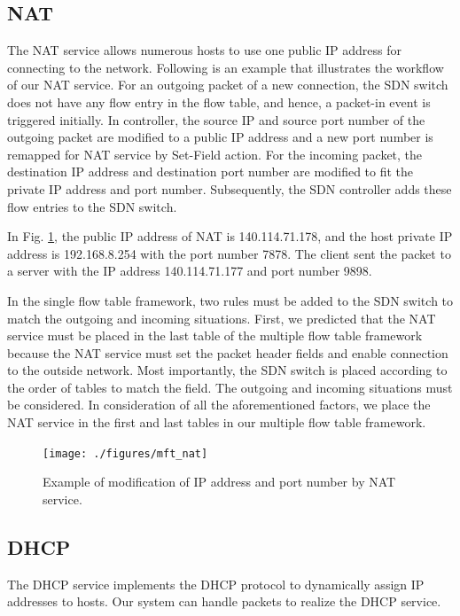\documentclass[conference]{IEEEtran}
\begin{document}
\subsection{NAT}
The NAT service allows numerous hosts to use one public IP address for connecting to the network.
Following is an example that illustrates the workflow of our NAT service.
For an outgoing packet of a new connection, the SDN switch does not have any flow entry in the flow table, and hence, a packet-in event is triggered initially.
In controller, the source IP and source port number of the outgoing packet are modified to a public IP address and a new port number is remapped for NAT service by Set-Field action.
For the incoming packet, the destination IP address and destination port number are modified to fit the private IP address and port number.
Subsequently, the SDN controller adds these flow entries to the SDN switch.

In Fig. \ref{fig:mft_nat}, the public IP address of NAT is 140.114.71.178, and the host private IP address is 192.168.8.254 with the port number 7878. The client sent the packet to a server with the IP address 140.114.71.177 and port number 9898.

In the single flow table framework, two rules must be added to the SDN switch to match the outgoing and incoming situations.
First, we predicted that the NAT service must be placed in the last table of the multiple flow table framework because the NAT service must set the packet header fields and enable connection to the outside network.
Most importantly, the SDN switch is placed according to the order of tables to match the field.
The outgoing and incoming situations must be considered.
In consideration of all the aforementioned factors, we place the NAT service in the first and last tables in our multiple flow table framework.

\begin{figure}[!t]
\centering
\texttt{[image: ./figures/mft\_nat]}
\caption{Example of modification of IP address and port number by NAT service.}
\label{fig:mft_nat}
\end{figure}



\subsection{DHCP}
The DHCP service implements the DHCP protocol to dynamically assign IP addresses to hosts.
Our system can handle packets to realize the DHCP service.
\end{document}
